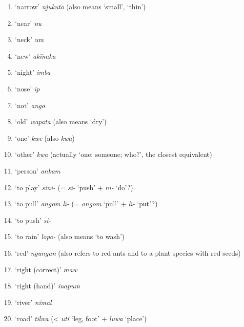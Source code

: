 \begin{enumerate}[noitemsep, label={\arabic*}, align=left, widest=190, labelsep=1ex,leftmargin=*]
\item ‘narrow’ \textit{njukuta} (also means ‘small’, ‘thin’)

\item ‘near’ \textit{nu}

\item ‘neck’ \textit{um}


\item ‘new’ \textit{akïnaka}

\item ‘night’ \textit{imba}

\item ‘nose’ \textit{ip}

\item ‘not’ \textit{ango}

\item ‘old’ \textit{wapata} (also means ‘dry’)

\item ‘one’ \textit{kwe} (also \textit{kwa})

\item ‘other’ \textit{kwa} (actually ‘one; someone; who?’, the closest equivalent)

\item ‘person’ \textit{ankam}

\item ‘to play’ \textit{sini-} (= \textit{si-} ‘push’ + \textit{ni-} ‘do’?)

\item ‘to pull’ \textit{angom lï-} (= \textit{angom} ‘pull’ + \textit{lï-} ‘put’?)

\item ‘to push’ \textit{si-}

\item ‘to rain’ \textit{lopo-} (also means ‘to wash’)

\item ‘red’ \textit{ngungun} (also refers to red ants and to a plant species with red seeds)

\item ‘right (correct)’ \textit{maw}

\item ‘right (hand)’ \textit{inapum}

\item ‘river’ \textit{nïmal}

\item ‘road’ \textit{tïlwa} (< \textit{utï} ‘leg, foot’ + \textit{luwa} ‘place’)


\end{enumerate}

